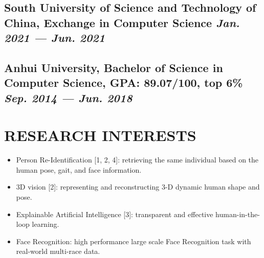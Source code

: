 \documentclass[a4,10pt]{article}
\newenvironment{zitemize}{
\begin{itemize}\itemsep0pt \parskip0pt \parsep1pt}
{\end{itemize}\vspace{-0.5cm}}
\begin{document}
\subsection*{South University of Science and Technology of China, {\normalsize \normalfont Exchange in Computer Science \hfill \textit{Jan. 2021 --- Jun. 2021}}}
\vspace{0.15cm}
\subsection*{Anhui University, {\normalsize \normalfont Bachelor of Science in Computer Science, GPA: 89.07/100, top 6\%  \hfill \textit{Sep. 2014 --- Jun. 2018}}}
\vspace{0.2cm}

\section{RESEARCH INTERESTS} 
\begin{zitemize}
    \item \label{*} Person Re-Identification [1, 2, 4]: retrieving the same individual based on the human pose, gait, and face information.
    \item \label{*} 3D vision [2]: representing and reconstructing 3-D dynamic human shape and pose.
    \item \label{*} Explainable Artificial Intelligence [3]: transparent and effective human-in-the-loop learning.
    \item \label{*} Face Recognition: high performance large scale Face Recognition task with real-world multi-race data.
\end{zitemize}

\end{document}
